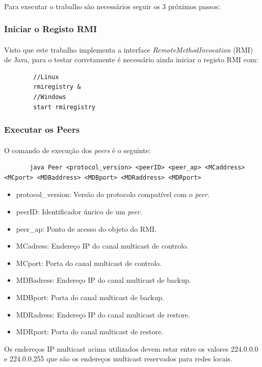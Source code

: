 \documentclass[11pt,oneside]{book}
\begin{document}
\paragraph{}
    Para executar o trabalho são necessários seguir os 3 próximos passos:
    
    \subsubsection{Iniciar o Registo RMI}
    \paragraph{}
    Visto que este trabalho implementa a interface \textit{RemoteMethodInvocation} (RMI) de
    Java, para o testar corretamente é necessário ainda iniciar o registo RMI com:
    \begin{lstlisting}
        //Linux
        rmiregistry &
        //Windows
        start rmiregistry
    \end{lstlisting}
    
    \subsubsection{Executar os Peers}
    \paragraph{}
    O comando de execução dos \textit{peers} é o seguinte:
    \begin{lstlisting}
       java Peer <protocol_version> <peerID> <peer_ap> <MCaddress> <MCport> <MDBaddress> <MDBport> <MDRaddress> <MDRport>
    \end{lstlisting}
    \begin{itemize}
        \item protocol\_version: Versão do protocolo compatível com o \textit{peer}.
        \item peerID: Identificador úncico de um \textit{peer}.
        \item peer\_ap: Ponto de acesso do objeto do RMI.
        \item MCadress: Endereço IP do canal multicast de controlo.
        \item MCport: Porta do canal multicast de controlo.
        \item MDBadress: Endereço IP do canal multicast de backup.
        \item MDBport: Porta do canal multicast de backup.
        \item MDRadress: Endereço IP do canal multicast de restore.
        \item MDRport: Porta do canal multicast de restore.
    \end{itemize}
        Os endereços IP multicast acima utilizados devem estar entre os valores 224.0.0.0 e
        224.0.0.255 que são os endereços multicast reservados para redes locais.
\end{document}
